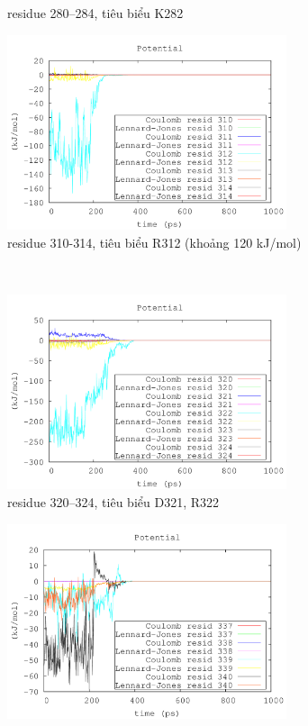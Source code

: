 \documentclass[12pt,a4paper,reqno, oneside]{book}
\begin{document}
\begin{figure}[h!]
\begin{subfigure}{0.5\textwidth}
\caption{\gls{residue} 280--284, tiêu biểu K282}
\label{fig:282}
\end{subfigure}
\begin{subfigure}{0.5\textwidth}
\includegraphics[width=0.9\textwidth,natwidth=610,natheight=642]{310-314}
\caption{\gls{residue} 310-314, tiêu biểu R312 (khoảng 120 kJ/mol)}
\label{fig:312}
\end{subfigure}\\
\begin{subfigure}{0.5\textwidth}
\includegraphics[width=0.9\textwidth,natwidth=610,natheight=642]{320-324}
\caption{\gls{residue} 320--324, tiêu biểu D321, R322}
\label{fig:322}
\end{subfigure}
\begin{subfigure}{0.5\textwidth}
\includegraphics[width=0.9\textwidth,natwidth=610,natheight=642]{337-340}

\end{subfigure}
\end{figure}
\end{document}
